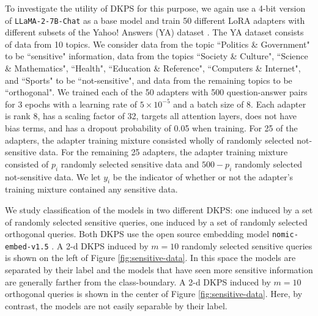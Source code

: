To investigate the utility of DKPS for this purpose, we again use a 4-bit version of \texttt{LLaMA-2-7B-Chat} as a base model and train 50 different LoRA adapters with different 
subsets of the Yahoo! Answers (YA) dataset \citep{NIPS2015_250cf8b5}.
The YA dataset consists of data from 10 topics.
We consider data from the topic ``Politics \& Government" to be ``sensitive" information, data from the topics ``Society \& Culture", ``Science \& Mathematics", ``Health", ``Education \& Reference", ``Computers \& Internet", and ``Sports" to be ``not-sensitive", and data from the remaining topics to be ``orthogonal". 
We trained each of the 50 adapters with 500 question-answer pairs for 3 epochs with a learning rate of $ 5 \times 10^{-5} $ and a batch size of 8. 
Each adapter is rank 8, has a scaling factor of 32, targets all attention layers, does not have bias terms, and has a dropout probability of 0.05 when training.
For 25 of the adapters, the adapter training mixture consisted wholly of randomly selected not-sensitive data.
For the remaining 25 adapters, the adapter training mixture consisted of $ p_{i} $ randomly selected sensitive data and $ 500 - p_{i} $ randomly selected not-sensitive data. 
We let $ y_{i} $ be the indicator of whether or not the adapter's training mixture contained any sensitive data.

We study classification of the models in two different DKPS: one induced by a set of randomly selected sensitive queries, one induced by a set of randomly selected orthogonal queries.
Both DKPS use the open source embedding model \texttt{nomic-embed-v1.5} \citep{nussbaum2024nomicembedtrainingreproducible}.
A 2-d DKPS induced by $m=10$ randomly selected sensitive queries is shown on the left of Figure \ref{fig:sensitive-data}.
In this space the models are separated by their label and the models that have seen more sensitive information are generally farther from the class-boundary.
A 2-d DKPS induced by $m=10$ orthogonal queries is shown in the center of Figure \ref{fig:sensitive-data}.
Here, by contrast, the models are not easily separable by their label.

